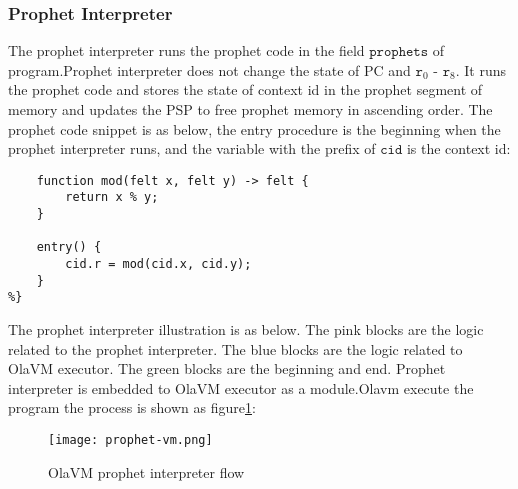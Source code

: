 \subsubsection{Prophet Interpreter}\label{subsec: prophet-interpreter}
The prophet interpreter runs the prophet code in the field $\texttt{prophets}$ of program.Prophet interpreter does not change the state of PC and $\texttt{r}_{0}$ - $\texttt{r}_{8}$.
It runs the prophet code and stores the state of context id in the prophet segment of memory and updates the PSP to free prophet memory in ascending order.
The prophet code snippet is as below, the entry procedure is the beginning when the prophet interpreter runs, and the variable with the prefix of $\texttt{cid}$ is the context id:
\begin{lstlisting}[label={lst:prophet-demo}]
%{
    function mod(felt x, felt y) -> felt {
        return x % y;
    }

    entry() {
        cid.r = mod(cid.x, cid.y);
    }
%}
\end{lstlisting}

The prophet interpreter illustration is as below.
The pink blocks are the logic related to the prophet interpreter.
The blue blocks are the logic related to OlaVM executor.
The green blocks are the beginning and end.
Prophet interpreter is embedded to OlaVM executor as a module.Olavm execute the program the process is shown as figure\ref{fig:prophet-interpreter-logic}:
\begin{figure}[!htp]
    \centering
    \texttt{[image: prophet-vm.png]}
    \caption{OlaVM prophet interpreter flow}
    \label{fig:prophet-interpreter-logic}
\end{figure}

